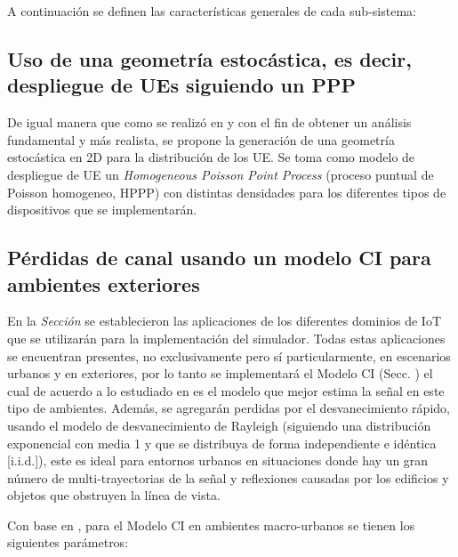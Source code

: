 A continuación se definen las características generales de cada sub-sistema:\newline

\subsection{Uso de una geometría estocástica, es decir, despliegue de UEs siguiendo un PPP}

De igual manera que como se realizó en \parencite{Kouzayha2018} y \parencite{Zhang2017} con el fin de obtener un análisis fundamental y más realista, se propone la generación de una geometría estocástica en 2D para la distribución de los UE. Se toma como modelo de despliegue de UE un \textit{ Homogeneous Poisson Point Process }(proceso puntual de Poisson homogeneo, HPPP) con distintas densidades para los diferentes tipos de dispositivos que se implementarán.\newline

\subsection{Pérdidas de canal usando un modelo CI para ambientes exteriores}

En la \textit{Sección } se establecieron las aplicaciones de los diferentes dominios de IoT que se utilizarán para la implementación del simulador. Todas estas aplicaciones se encuentran presentes, no exclusivamente pero sí particularmente, en escenarios urbanos y en exteriores, por lo tanto se implementará el Modelo CI (Secc. ) el cual de acuerdo a lo estudiado en \parencite{Sun2016} es el modelo que mejor estima la señal en este tipo de ambientes. Además, se agregarán perdidas por el desvanecimiento rápido, usando el modelo de desvanecimiento de Rayleigh (siguiendo una distribución exponencial con media 1 y que se distribuya de forma independiente e idéntica [i.i.d.]), este es ideal para entornos urbanos en situaciones donde hay un gran número de multi-trayectorias de la señal y reflexiones causadas por los edificios y objetos que obstruyen la línea de vista. \newline

Con base en \parencite{Sun2016}, para el Modelo CI en ambientes macro-urbanos se tienen los siguientes parámetros:

